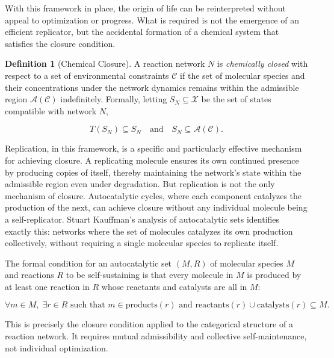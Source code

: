 \documentclass[12pt, a4paper, oneside]{article}
\theoremstyle{plain}
\theoremstyle{definition}
\newtheorem{definition}[theorem]{Definition}
\theoremstyle{remark}
\newcommand{\X}{\mathcal{X}}
\newcommand{\C}{\mathcal{C}}
\newcommand{\A}{\mathcal{A}}
\newcommand{\T}{T}
\begin{document}
With this framework in place, the origin of life can be reinterpreted without appeal to optimization or progress. What is required is not the emergence of an efficient replicator, but the accidental formation of a chemical system that satisfies the closure condition.

\begin{definition}[Chemical Closure]
A reaction network $N$ is \emph{chemically closed} with respect to a set of environmental constraints $\C$ if the set of molecular species and their concentrations under the network dynamics remains within the admissible region $\A(\C)$ indefinitely. Formally, letting $S_N \subseteq \X$ be the set of states compatible with network $N$,

\begin{equation}
\T(S_N) \subseteq S_N \quad \text{and} \quad S_N \subseteq \A(\C).
\end{equation}
\end{definition}

Replication, in this framework, is a specific and particularly effective mechanism for achieving closure. A replicating molecule ensures its own continued presence by producing copies of itself, thereby maintaining the network's state within the admissible region even under degradation. But replication is not the only mechanism of closure. Autocatalytic cycles, where each component catalyzes the production of the next, can achieve closure without any individual molecule being a self-replicator. Stuart Kauffman's analysis of autocatalytic sets identifies exactly this: networks where the set of molecules catalyzes its own production collectively, without requiring a single molecular species to replicate itself.

The formal condition for an autocatalytic set $(M, R)$ of molecular species $M$ and reactions $R$ to be self-sustaining is that every molecule in $M$ is produced by at least one reaction in $R$ whose reactants and catalysts are all in $M$:

\begin{equation}
\forall m \in M, \; \exists r \in R \text{ such that } m \in \mathrm{products}(r) \text{ and } \mathrm{reactants}(r) \cup \mathrm{catalysts}(r) \subseteq M.
\end{equation}

This is precisely the closure condition applied to the categorical structure of a reaction network. It requires mutual admissibility and collective self-maintenance, not individual optimization.
\end{document}

